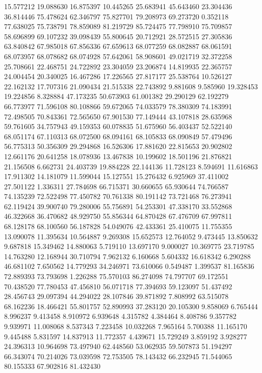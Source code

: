 15.577212
19.088630
16.875397
10.445265
25.683941
45.643460
23.304436
36.814446
75.478624
62.346797
75.827701
79.208973
69.273720
0.352118
77.638025
75.738791
78.859089
81.219729
85.724475
77.798910
75.709857
58.696899
69.107232
39.098439
55.800645
20.712921
28.572515
27.305836
63.840842
67.985018
67.856336
67.659613
68.077259
68.082887
68.061591
68.073957
68.078682
68.074928
57.642061
58.908601
49.021719
32.372258
25.708661
22.468751
24.722892
23.304059
23.206874
14.819935
22.365757
24.004454
20.340025
16.467286
17.226565
27.817177
25.538764
10.526127
22.162132
17.707316
21.090434
21.515338
22.743892
9.881608
9.585960
19.328453
19.224856
8.328884
47.173235
50.673903
61.001382
29.290129
62.192279
66.773977
71.596108
80.108866
59.672065
74.033579
78.380309
74.183991
72.498505
70.843361
72.565650
67.901530
77.149444
43.107818
28.635968
59.761605
34.757943
49.159353
60.078835
51.675960
56.403437
52.522140
68.051174
67.110313
68.072500
68.094161
68.105833
68.090849
57.479496
56.775313
50.356309
29.294868
16.526306
17.881620
22.815653
20.902802
12.661176
20.641258
18.078936
13.467838
10.199602
18.501196
21.876821
21.156508
6.662731
24.403739
19.884228
22.144136
11.728123
8.594691
11.616863
17.911302
14.181079
11.599044
15.127551
15.276432
6.925969
37.411002
27.501122
1.336311
27.784698
66.715371
30.660655
65.930644
74.766587
74.135239
72.522498
77.450782
70.761338
80.191142
73.721468
76.273941
62.119424
39.900740
79.280006
55.756891
54.253301
47.338170
33.552868
46.322668
36.470682
48.929750
55.856344
64.870428
67.476709
67.997811
68.128178
68.100560
56.187828
54.049076
42.433361
25.410075
11.755355
13.090078
11.395634
10.564887
9.269308
15.652573
12.764052
9.473445
13.850632
9.687818
15.349462
14.880063
5.719110
13.697170
9.000027
10.369775
23.719785
14.763280
12.168944
30.710794
7.962132
6.160668
5.604332
16.618342
6.290288
46.681102
7.650562
14.779293
34.246971
73.610066
0.549487
1.399537
81.165836
72.889393
73.793698
1.226288
75.570103
86.274098
74.797707
69.172551
70.438520
77.780453
47.456810
56.071718
77.394693
59.123097
51.437492
28.456743
29.097394
44.294022
28.107846
39.871892
7.808992
63.515078
68.162236
18.466421
55.801757
52.890993
37.283120
20.105300
9.858069
6.765444
8.996237
9.413458
8.910972
6.939648
4.315782
4.384464
8.408786
9.357782
9.939971
11.008068
8.537343
7.223458
10.032268
7.965164
5.700388
11.165170
9.445488
5.831597
14.837913
11.772357
4.439671
15.729249
3.859192
3.928277
24.396313
10.964698
73.497940
62.448560
53.062935
59.507873
51.194297
66.343074
70.214026
73.039598
72.753505
78.143432
66.232945
71.544065
80.155333
67.902816
81.432430
